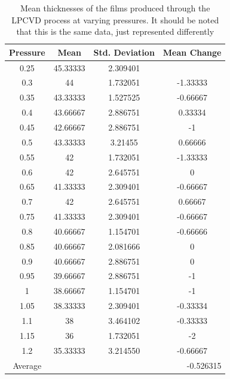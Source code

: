 \documentclass[letterpaper]{article}
\begin{document}
\begin{table}[H]
 \centering
 \begin{tabular}{|c|c|c|c|}
  \hline
  Pressure & Mean                           & Std. Deviation & Mean Change \\ \hline
  0.25     & 45.33333                       & 2.309401       &             \\ \hline
  0.3      & 44                             & 1.732051       & -1.33333    \\ \hline
  0.35     & 43.33333                       & 1.527525       & -0.66667    \\ \hline
  0.4      & 43.66667                       & 2.886751       & 0.33334     \\ \hline
  0.45     & 42.66667                       & 2.886751       & -1          \\ \hline
  0.5      & 43.33333                       & 3.21455        & 0.66666     \\ \hline
  0.55     & 42                             & 1.732051       & -1.33333    \\ \hline
  0.6      & 42                             & 2.645751       & 0           \\ \hline
  0.65     & 41.33333                       & 2.309401       & -0.66667    \\ \hline
  0.7      & 42                             & 2.645751       & 0.66667     \\ \hline
  0.75     & 41.33333                       & 2.309401       & -0.66667    \\ \hline
  0.8      & 40.66667                       & 1.154701       & -0.66666    \\ \hline
  0.85     & 40.66667                       & 2.081666       & 0           \\ \hline
  0.9      & 40.66667                       & 2.886751       & 0           \\ \hline
  0.95     & 39.66667                       & 2.886751       & -1          \\ \hline
  1        & 38.66667                       & 1.154701       & -1          \\ \hline
  1.05     & 38.33333                       & 2.309401       & -0.33334    \\ \hline
  1.1      & 38                             & 3.464102       & -0.33333    \\ \hline
  1.15     & 36                             & 1.732051       & -2          \\ \hline
  1.2      & 35.33333                       & 3.214550       & -0.66667    \\ \hline
  Average  & \multicolumn{3}{r|}{-0.526315}                                \\ \hline
 \end{tabular}
 \caption{Mean thicknesses of the films produced through the LPCVD process at varying pressures. It should be noted that this is the same data, just represented differently}
 \label{pressurestat}
\end{table}
\end{document}
